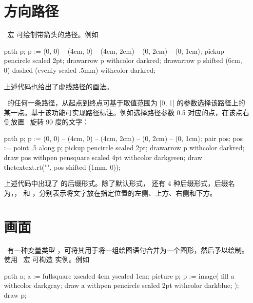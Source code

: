 \section{方向路径}

\METAPOST\ 宏  可绘制带箭头的路径。例如

\startexample
\startMPcode
path p; p := (0, 0) -- (4cm, 0) -- (4cm, 2cm) -- (0, 2cm) -- (0, 1cm);
pickup pencircle scaled 2pt;
drawarrow p withcolor darkred;
drawarrow p shifted (6cm, 0) dashed (evenly scaled .5mm) withcolor darkred;
\stopMPcode
\stopexample
\typeexample[option=MP]
\midaligned{\getexample}

\noindent 上述代码也给出了虚线路径的画法。

\METAPOST\ 的任何一条路径，从起点到终点可基于取值范围为 [0, 1] 的参数选择该路径上的某一点。基于该功能可实现路径标注。例如选择路径参数 0.5 对应的点，在该点右侧放置 \CONTEXT\ 旋转 90 度的文字：

\startexample
\startMPcode
path p; p := (0, 0) -- (4cm, 0)
             -- (4cm, 2cm) -- (0, 2cm) -- (0, 1cm);
pair pos; pos := point .5 along p;
pickup pencircle scaled 2pt;
drawarrow p withcolor darkred;
draw pos withpen pensquare scaled 4pt
         withcolor darkgreen;
draw thetextext.rt("",
                   pos shifted (1mm, 0));
\stopMPcode
\stopexample
\simpleexample[option=MP]{\getexample}

\noindent 上述代码中出现了  的后缀形式。除了默认形式， 还有 4 种后缀形式，后缀名为，， 和 ，分别表示将文字放在指定位置的左侧、上方、右侧和下方。

\section{画面}

\METAPOST\ 有一种变量类型 ，可将其用于将一组绘图语句合并为一个图形，然后予以绘制。使用 \METAPOST\ 宏  可构造  实例。例如

\startexample
\startMPcode
path a; a := fullsquare xscaled 4cm yscaled 1cm;
picture p; p := image(
  fill a withcolor darkgray;
  draw a withpen pencircle scaled 2pt withcolor darkblue;
);
draw p;
\stopMPcode
\stopexample
\simpleexample[option=MP]{\getexample}

